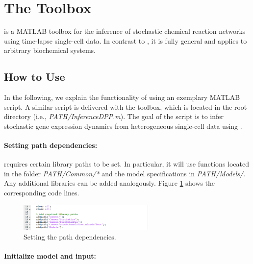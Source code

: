 \documentclass[a4paper, 9pt]{scrartcl}
\begin{document}
\section{The \DPP Toolbox}

\DPP is a MATLAB toolbox for the inference of stochastic chemical reaction networks using time-lapse single-cell data. In contrast to \GuiDPP, it is fully general and applies to arbitrary biochemical systems.

\subsection{How to Use \DPP}
\label{sec:DPP}
In the following, we explain the functionality of \DPP using an exemplary MATLAB script. A similar script is delivered with the toolbox, which is located in the root directory (i.e., \textit{PATH/InferenceDPP.m}). The goal of the script is to infer stochastic gene expression dynamics from heterogeneous single-cell data using \DPP. 

\paragraph{Setting path dependencies:}

\DPP requires certain library paths to be set. In particular, it will use functions located in the folder \textit{PATH/Common/*} and the model specifications in \textit{PATH/Models/}. Any additional libraries can be added analogously. Figure \ref{fig:Paths} shows the corresponding code lines.

\begin{figure}[ht!]
\begin{center}
	\includegraphics[width=0.6\textwidth]{figures/Doc_Paths}
\caption{Setting the path dependencies.}
\label{fig:Paths}
\end{center}
\end{figure}

\paragraph{Initialize model and input:}
\end{document}
